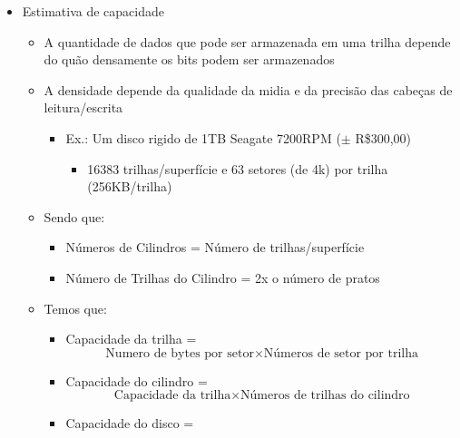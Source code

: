 \documentclass[12pt]{article}
\begin{document}
\begin{itemize}
\begin{itemize}
\begin{itemize}
                cima, e na parte de baixo. (Na hora de contar as trilhas de um 
                prato, se contar só pela parte de cima, lembrar de multiplicar 
                por 2)
            \end{itemize}
            \item Toda a informação adicional em um cilindro pode ser acessada 
        \end{itemize}
        \item Estimativa de capacidade
        \begin{itemize}
            \item A quantidade de dados que pode ser armazenada em uma trilha 
            depende do quão densamente os bits podem ser armazenados
            \item A densidade depende da qualidade da midia e da precisão das 
            cabeças de leitura/escrita
            \begin{itemize}
                \item Ex.: Um disco rigido de 1TB Seagate 7200RPM ($\pm$ R\$300,00)
                \begin{itemize}
                    \item 16383 trilhas/superfície e 63 setores (de 4k) por 
                    trilha (256KB/trilha)
                \end{itemize}
            \end{itemize}
            \item Sendo que: 
            \begin{itemize}
                \item Números de Cilindros = Número de trilhas/superfície
                \item Número de Trilhas do Cilindro = 2x o número de pratos 
            \end{itemize}
            \item Temos que:
            \begin{itemize}
                \item Capacidade da trilha = 
                \[
                \text{Numero de bytes por setor} \times \text{Números de setor 
                por trilha} 
                \]
                \item Capacidade do cilindro = 
                \[
                \text{Capacidade da trilha} \times \text{Números de trilhas do 
                cilindro} 
                \]
                \item Capacidade do disco = 

\end{itemize}
\end{itemize}
\end{itemize}
\end{document}
